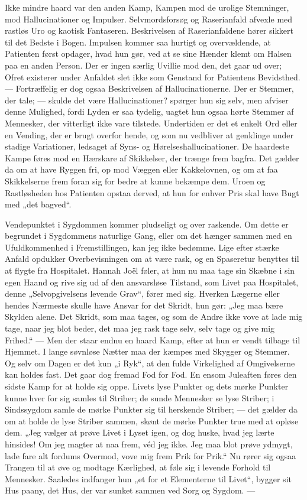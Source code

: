 \documentclass[12pt,a4paper,openany]{book}
\newcommand{\opage}[1]{\marginnote{\footnotesize\textit{[#1]}}}
\begin{document}
Ikke mindre haard var den anden Kamp, Kampen mod de
urolige Stemninger, mod Hallucinationer og Impulser. Selvmordsforsøg
og Raserianfald afvexle med rastløs Uro og kaotisk Fantaseren.
Beskrivelsen af Raserianfaldene hører sikkert til det
Bedste i Bogen. Impulsen kommer saa hurtigt og overvældende,
at Patienten først opdager, hvad hun gør, ved at se sine Hænder
klemt om Halsen paa en anden Person. Der er ingen særlig
Uvillie mod den, det gaar ud over; Ofret existerer under Anfaldet
slet ikke som Genstand for Patientens Bevidsthed.
--- Fortræffelig er dog ogsaa Beskrivelsen af Hallucinationerne.
Der er Stemmer, der tale; --- skulde det være Hallucinationer?
spørger hun sig selv, men afviser denne Mulighed, fordi Lyden
er saa tydelig, uagtet hun ogsaa hørte Stemmer af Mennesker,
der vitterligt ikke vare tilstede. Undertiden er det et enkelt
Ord eller en Vending, der er brugt overfor hende, og som nu
vedbliver at genklinge under stadige Variationer, ledsaget af
Syns- og Hørelseshallucinationer. De haardeste Kampe føres mod
en Hærskare af Skikkelser, der trænge frem bagfra. Det gælder
da om at have Ryggen fri, op mod Væggen eller Kakkelovnen,
og om at faa Skikkelserne frem foran sig for bedre at
kunne bekæmpe dem. Uroen og Rastløsheden hos Patienten
opstaa derved, at hun for enhver Pris skal have Bugt med
„det bagved“.

Vendepunktet i Sygdommen kommer pludseligt og over%
\setcounter{footnote}{0}%
\opage{81}raskende. Om dette er begrundet i Sygdommens naturlige Gang,
eller om det hænger sammen med en Ufuldkommenhed i Fremstillingen,
kan jeg ikke bedømme. Lige efter stærke Anfald
opdukker Overbevisningen om at være rask, og en Spaseretur
benyttes til at flygte fra Hospitalet. Hannah Joël føler, at hun
nu maa tage sin Skæbne i sin egen Haand og rive sig ud af
den ansvarsløse Tilstand, som Livet paa Hospitalet, denne „Selvopgivelsens
levende Grav“, fører med sig. Hverken Lægerne
eller hendes Nærmeste skulle have Ansvar for det Skridt, hun
gør: „Jeg maa bære Skylden alene. Det Skridt, som maa tages,
og som de Andre ikke vove at lade mig tage, naar jeg blot
beder, det maa jeg rask tage selv, selv tage og give mig Frihed.“
--- Men der staar endnu en haard Kamp, efter at hun
er vendt tilbage til Hjemmet. I lange søvnløse Nætter maa der
kæmpes med Skygger og Stemmer. Og selv om Dagen er det
kun „i Ryk“, at den fulde Virkelighed af Omgivelserne kan
holdes fast. Det gaar dog fremad Fod for Fod. En ensom Juleaften
føres den sidste Kamp for at holde sig oppe. Livets lyse
Punkter og dets mørke Punkter kunne hver for sig samles til
Striber; de sunde Mennesker se lyse Striber; i Sindssygdom
samle de mørke Punkter sig til herskende Striber; --- det gælder
da om at holde de lyse Striber sammen, skønt de mørke
Punkter true med at opløse dem. „Jeg vælger at prøve Livet
i Lyset igen, og dog huske, hvad jeg lærte hinsides! Om jeg
magter at naa frem, véd jeg ikke. Jeg maa blot prøve ydmygt,
lade fare alt fordums Overmod, vove mig frem Prik for Prik.“
Nu rører sig ogsaa Trangen til at øve og modtage Kærlighed,
at føle sig i levende Forhold til Mennesker. Saaledes indfanger
hun „et for et Elementerne til Livet“, bygger sit Hus paany,
det Hus, der var sunket sammen ved Sorg og Sygdom. ---
\end{document}
